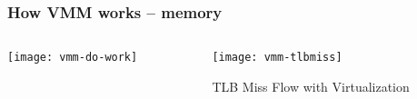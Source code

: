 \begin{frame}[plain]
	\frametitle{How VMM works -- memory}
	
	
	
	\begin{columns}
		
		\begin{column}{.2\textwidth}
			\centering
			\texttt{[image: vmm-do-work]}
			
		\end{column}
		
		\begin{column}{.8\textwidth}
			
			
			\centering
			\texttt{[image: vmm-tlbmiss]}	
			
			TLB Miss Flow with Virtualization
			
			
			
		\end{column}
		
		
	\end{columns}
	
	
\end{frame}

